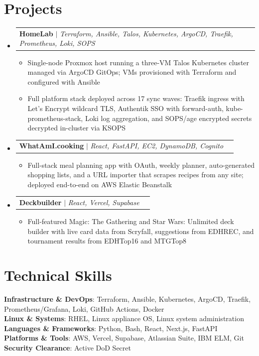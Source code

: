 \documentclass[letterpaper,10pt]{article}
\makeatletter
\newcommand{\resumeItem}[1]{
  \item\small{{#1 \vspace{-2pt}}}
}
\newcommand{\resumeProjectHeading}[2]{
  \item
    \begin{tabular*}{0.97\textwidth}{l@{\extracolsep{\fill}}r}
      \small#1 & #2 \\
    \end{tabular*}\vspace{-6pt}
}
\newcommand{\resumeSubHeadingListStart}{\begin{itemize}[leftmargin=0.15in, label={}]}
\newcommand{\resumeSubHeadingListEnd}{\end{itemize}}
\newcommand{\resumeItemListStart}{\begin{itemize}}
\newcommand{\resumeItemListEnd}{\end{itemize}\vspace{-6pt}}
\makeatother
\begin{document}
\section{Projects}
  \resumeSubHeadingListStart
    \resumeProjectHeading
      {\textbf{HomeLab} $|$ \emph{Terraform, Ansible, Talos, Kubernetes, ArgoCD, Traefik, Prometheus, Loki, SOPS}}{}
      \resumeItemListStart
        \resumeItem{Single-node Proxmox host running a three-VM Talos Kubernetes cluster managed via ArgoCD GitOps; VMs provisioned with Terraform and configured with Ansible}
        \resumeItem{Full platform stack deployed across 17 sync waves: Traefik ingress with Let's Encrypt wildcard TLS, Authentik SSO with forward-auth, kube-prometheus-stack, Loki log aggregation, and SOPS/age encrypted secrets decrypted in-cluster via KSOPS}
      \resumeItemListEnd
    \resumeProjectHeading
      {\textbf{WhatAmI.cooking} $|$ \emph{React, FastAPI, EC2, DynamoDB, Cognito}}{}
      \resumeItemListStart
        \resumeItem{Full-stack meal planning app with OAuth, weekly planner, auto-generated shopping lists, and a URL importer that scrapes recipes from any site; deployed end-to-end on AWS Elastic Beanstalk}
      \resumeItemListEnd
    \resumeProjectHeading
      {\textbf{Deckbuilder} $|$ \emph{React, Vercel, Supabase}}{}
      \resumeItemListStart
        \resumeItem{Full-featured Magic: The Gathering and Star Wars: Unlimited deck builder with live card data from Scryfall, suggestions from EDHREC, and tournament results from EDHTop16 and MTGTop8}
      \resumeItemListEnd
  \resumeSubHeadingListEnd


\section{Technical Skills}
  \begin{itemize}[leftmargin=0.15in, label={}]
    \small{\item{
      \textbf{Infrastructure \& DevOps}{: Terraform, Ansible, Kubernetes, ArgoCD, Traefik, Prometheus/Grafana, Loki, GitHub Actions, Docker} \\
      \textbf{Linux \& Systems}{: RHEL, Linux appliance OS, Linux system administration} \\
      \textbf{Languages \& Frameworks}{: Python, Bash, React, Next.js, FastAPI} \\
      \textbf{Platforms \& Tools}{: AWS, Vercel, Supabase, Atlassian Suite, IBM ELM, Git} \\
      \textbf{Security Clearance}{: Active DoD Secret}
    }}
  \end{itemize}

  
\end{document}

